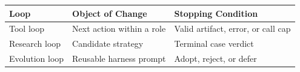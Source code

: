 \begin{tabular}{@{}P{3.0cm}P{4.6cm}P{4.9cm}@{}}
\toprule
\textbf{Loop} & \textbf{Object of Change} & \textbf{Stopping Condition} \\
\midrule
Tool loop & Next action within a role & Valid artifact, error, or call cap \\
Research loop & Candidate strategy & Terminal case verdict \\
Evolution loop & Reusable harness prompt & Adopt, reject, or defer \\
\bottomrule
\end{tabular}
